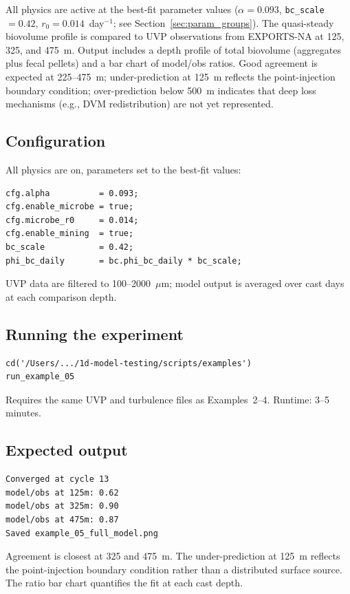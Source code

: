 \documentclass[12pt,a4paper]{report}
\numberwithin{equation}{chapter}
\begin{document}
All physics are active at the best-fit parameter values ($\alpha = 0.093$,
\texttt{bc\_scale}~$= 0.42$, $r_0 = 0.014$~day$^{-1}$;
see Section~\ref{sec:param_groups}). The quasi-steady biovolume profile is
compared to UVP observations from EXPORTS-NA at 125, 325, and 475~m.
Output includes a depth profile of total biovolume (aggregates plus fecal
pellets) and a bar chart of model/obs ratios. Good agreement is expected at
225--475~m; under-prediction at 125~m reflects the point-injection boundary
condition; over-prediction below 500~m indicates that deep loss mechanisms
(e.g., DVM redistribution) are not yet represented.

\subsection{Configuration}

All physics are on, parameters set to the best-fit values:

\begin{lstlisting}
cfg.alpha          = 0.093;
cfg.enable_microbe = true;
cfg.microbe_r0     = 0.014;
cfg.enable_mining  = true;
bc_scale           = 0.42;
phi_bc_daily       = bc.phi_bc_daily * bc_scale;
\end{lstlisting}

UVP data are filtered to 100--2000~$\mu$m; model output is averaged over
cast days at each comparison depth.

\subsection{Running the experiment}

\begin{lstlisting}[numbers=none]
cd('/Users/.../1d-model-testing/scripts/examples')
run_example_05
\end{lstlisting}

Requires the same UVP and turbulence files as Examples~2--4. Runtime:
3--5 minutes.

\subsection{Expected output}

\begin{verbatim}
Converged at cycle 13
model/obs at 125m: 0.62
model/obs at 325m: 0.90
model/obs at 475m: 0.87
Saved example_05_full_model.png
\end{verbatim}

Agreement is closest at 325 and 475~m. The under-prediction at 125~m
reflects the point-injection boundary condition rather than a distributed
surface source. The ratio bar chart quantifies the fit at each cast depth.
\end{document}
